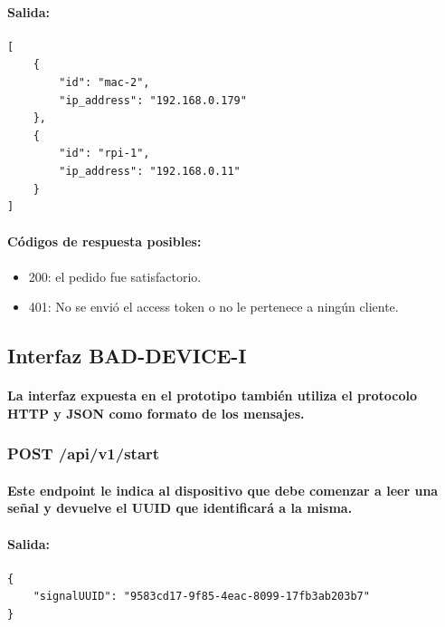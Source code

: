 \documentclass{article}
\begin{document}
\paragraph{
Salida:
}

\begin{verbatim}
[
    {
        "id": "mac-2",
        "ip_address": "192.168.0.179"
    },
    {
        "id": "rpi-1",
        "ip_address": "192.168.0.11"
    }
]

\end{verbatim}

\paragraph{
Códigos de respuesta posibles:
}
\begin{itemize}
    \item 200: el pedido fue satisfactorio.
    \item 401: No se envió el access token o no le pertenece a ningún cliente.
\end{itemize}

\subsection{Interfaz BAD-DEVICE-I}
\paragraph{
La interfaz expuesta en el prototipo también utiliza el protocolo HTTP y JSON como formato de los mensajes.
}
\subsubsection{POST /api/v1/start}
\paragraph{
Este endpoint le indica al dispositivo que debe comenzar a leer una señal y devuelve el UUID que identificará a la misma.
}
\paragraph{
Salida:}

\begin{verbatim}
{
    "signalUUID": "9583cd17-9f85-4eac-8099-17fb3ab203b7"
}
\end{verbatim}
\end{document}
